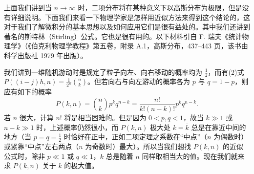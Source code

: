 上面我们讲到当 $n\to\infty$ 时，二项分布将在某种意义下以高斯分布为极限，但是没有详细说明。下面我们来看一下物理学家是怎样用近似方法来得到这个结论的，这对于我们了解微积分的基本思想以及如何应用它们是很有益处的。其中我们还讲到著名的斯特林（Stirling）公式。它也是很有用的。以下材料引自 F. 瑞夫《统计物理学》（《伯克利物理学教程》第五卷，附录 A.1，高斯分布，437--443 页，该书由科学出版社 1979 年出版）。

我们讲到一维随机游动时是规定了粒子向左、向右移动的概率均为 $\frac12$，而有(2)式 $P((i-j)h,n)=\frac1{2^n}\binom nk$。但若向右与向左游动的概率各为 $p$ 与 $q=1-p$，则应有如下的概率
\begin{equation}
 P(k,n)=\binom nkp^kq^{n-k}=\frac{n!}{k!(n-k)!}p^kq^{n-k}.
 \tag{15}
\end{equation}
若 $n$ 很大，计算 $n!$ 将是相当困难的。但是因为 $0<p,q<1$，故当 $k\gg1$ 或 $n-k\gg1$ 时，上述概率仍然很小，而 $P(k,n)$ 极大处 $k=\bar k$ 总是在靠近中间的地方（当 $p=q=\frac12$ 时恰好在正中，正如二项定理之系数在“中点”（$n$ 为偶数时）或紧靠“中点”左右两点（$n$ 为奇数时）最大）。所以当我们想找 $P(k,n)$ 的近似公式时，除非 $p\ll1$ 或 $q\ll1$，$k$ 总是随着 $n$ 同样取相当大的值。现在我们就来求 $P(k,n)$ 关于 $k$ 的极大值。

